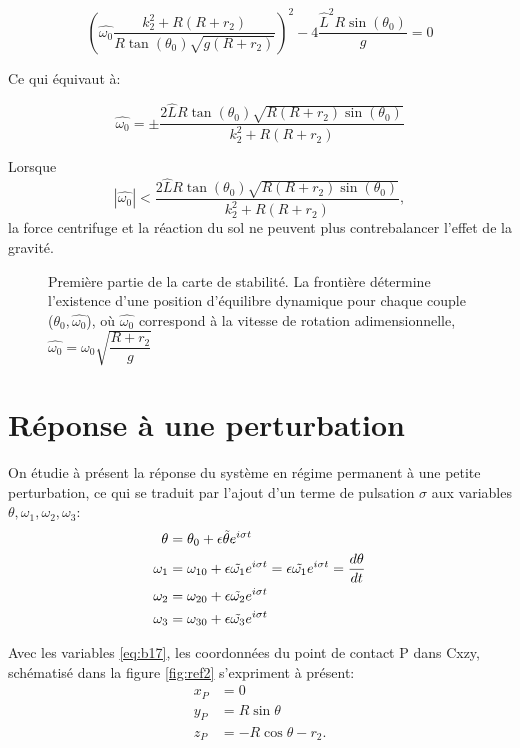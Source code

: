 \begin{equation}
(\hat{\omega_0} \frac{k_2^2+R(R+r_2)}{R \tan(\theta_0) \sqrt{g(R+r_2)}})^2-4\frac{ \hat{L}^2 R \sin(\theta_0)}{g} = 0
\label{eq:b15}
\end{equation}

Ce qui équivaut à:

\begin{equation}
 \hat{\omega_0}= \pm \frac{2\hat{L} R \tan(\theta_0) \sqrt{R(R+r_2)\sin(\theta_0)}}{k_2^2+R(R+r_2)}
  \label{eq:b16}
\end{equation}

Lorsque $$ |\hat{\omega_0}| < \frac{2\hat{L} R \tan(\theta_0) \sqrt{R(R+r_2)\sin(\theta_0)}}{k_2^2+R(R+r_2)},
$$
 la force centrifuge et la réaction du sol ne peuvent plus contrebalancer l'effet de la gravité.
 
\begin{figure}[h]
\centering
\def\svgwidth{370}

\caption{Première partie de la carte de stabilité. La frontière détermine l'existence d'une position d'équilibre dynamique pour chaque couple ($\theta_0,\hat{\omega_0}$), où $\hat{\omega_0}$ correspond à la vitesse de rotation adimensionnelle, $\hat{\omega_0}=\omega_0 \sqrt{\dfrac{R+r_2}{g}}$}
\end{figure}

\section{Réponse à une perturbation}

On étudie à présent la réponse du système en régime permanent à une petite perturbation, ce qui se traduit par l'ajout d'un terme de pulsation $\sigma$ aux variables $\theta, \omega_1, \omega_2, \omega_3$: \\


\begin{align}
 \theta&=\theta_0 + \epsilon \Tilde{\theta} e^{i \sigma t} \nonumber\\
 \omega_1&= \omega_{10} + \epsilon \Tilde{\omega_1} e^{i \sigma t} = \epsilon \Tilde{\omega_1} e^{i \sigma t} = \frac{d\theta }{dt} \nonumber\\
 \omega_2&= \omega_{20} + \epsilon \Tilde{\omega_2} e^{i \sigma t} \nonumber\\
 \omega_3&= \omega_{30} + \epsilon \Tilde{\omega_3} e^{i \sigma t}
  \label{eq:b17}
\end{align}

Avec les variables \ref{eq:b17}, les coordonnées du point de contact P dans C{xzy}, schématisé dans la figure \ref{fig:ref2} s'expriment à présent:
\begin{align}
    x_P&=0 \nonumber\\
    y_P&=R\sin{\theta} \nonumber\\
    z_P&=-R\cos{\theta}-r_2.
  \label{eq:b2p}
\end{align}


